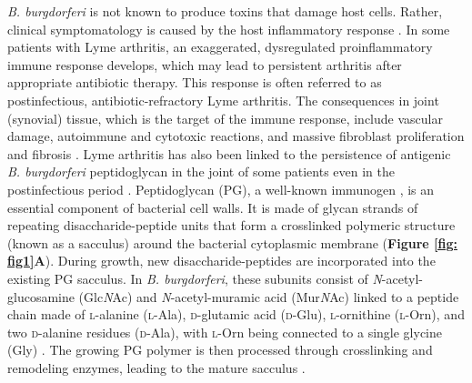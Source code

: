 \documentclass[twoside, watermark]{zHenriquesLab-StyleBioRxiv}
\newcommand{\NAM}{Mur\textit{N}Ac}
\newcommand{\NAG}{Glc\textit{N}Ac}
\newcommand{\scl}{\textsc{l}} %
\newcommand{\scd}{\textsc{d}} %
\begin{document}
\vspace{1mm}
\textit{B. burgdorferi} is not known to produce toxins that damage host cells. Rather, clinical symptomatology is caused by the host inflammatory response \cite{Arvikar2015}. In some patients with Lyme arthritis, an exaggerated, dysregulated proinflammatory immune response develops, which may lead to persistent arthritis after appropriate antibiotic therapy. This response is often referred to as postinfectious, antibiotic-refractory Lyme arthritis. The consequences in joint (synovial) tissue, which is the target of the immune response, include vascular damage, autoimmune and cytotoxic reactions, and massive fibroblast proliferation and fibrosis \cite{Lochhead2021}. Lyme arthritis has also been linked to the persistence of antigenic \textit{B. burgdorferi} peptidoglycan in the joint of some patients even in the postinfectious period \cite{Jutras2019}. Peptidoglycan (PG), a well-known immunogen \cite{Wolf2018}, is an essential component of bacterial cell walls. It is made of glycan strands of repeating disaccharide-peptide units that form a crosslinked polymeric structure (known as a sacculus) around the bacterial cytoplasmic membrane (\textbf{Figure \ref{fig: fig1}A}). During growth, new disaccharide-peptides are incorporated into the existing PG sacculus. In \textit{B. burgdorferi}, these subunits consist of \textit{N}-acetyl-glucosamine (\NAG ) and \textit{N}-acetyl-muramic acid (\NAM ) linked to a peptide chain made of \scl -alanine (\scl -Ala), \scd -glutamic acid (\scd -Glu), \scl -ornithine (\scl -Orn), and two \scd -alanine residues (\scd -Ala), with \scl -Orn being connected to a single glycine (Gly) \cite{Beck1990,Jutras2019}. The growing PG polymer is then processed through crosslinking and remodeling enzymes, leading to the mature sacculus \cite{Jutras2019}. 
\end{document}
